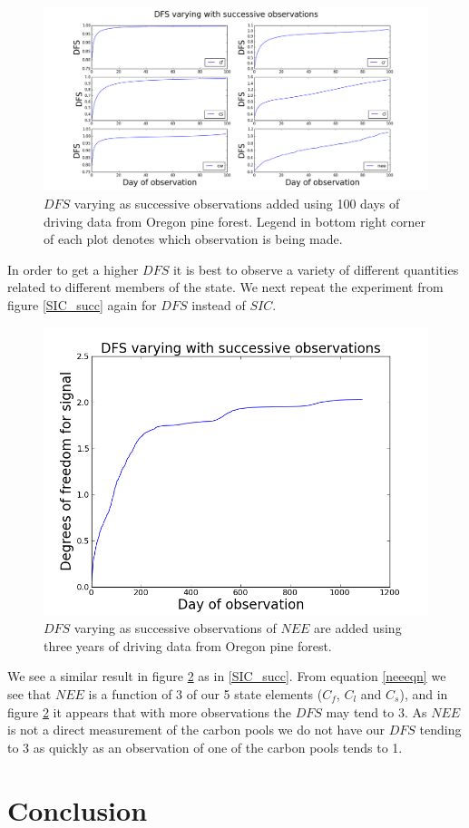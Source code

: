 \documentclass[11pt]{article}
\begin{document}
\begin{figure}[H]
\centering
\includegraphics[height=.42\textwidth]{dfssubplt.png}
\caption{$DFS$ varying as successive observations added using 100 days of driving data from Oregon pine forest. Legend in bottom right corner of each plot denotes which observation is being made.}
\label{dfsobs}
\end{figure}

In order to get a higher $DFS$ it is best to observe a variety of different quantities related to different members of the state. We next repeat the experiment from figure \ref{SIC_succ} again for $DFS$ instead of $SIC$.

\begin{figure}[H]
\centering
\includegraphics[height=.34\textwidth]{DFS0_1090nee.png}
\caption{$DFS$ varying as successive observations of $NEE$ are added using three years of driving data from Oregon pine forest.}
\label{dfsnee}
\end{figure}

We see a similar result in figure \ref{dfsnee} as in \ref{SIC_succ}. From equation \ref{neeeqn} we see that $NEE$ is a function of 3 of our 5 state elements ($C_f$, $C_l$ and $C_s$), and in figure \ref{dfsnee} it appears that with more observations the $DFS$ may tend to 3. As $NEE$ is not a direct measurement of the carbon pools we do not have our $DFS$ tending to 3 as quickly as an observation of one of the carbon pools tends to 1. 


\section{Conclusion}%
\end{document}
